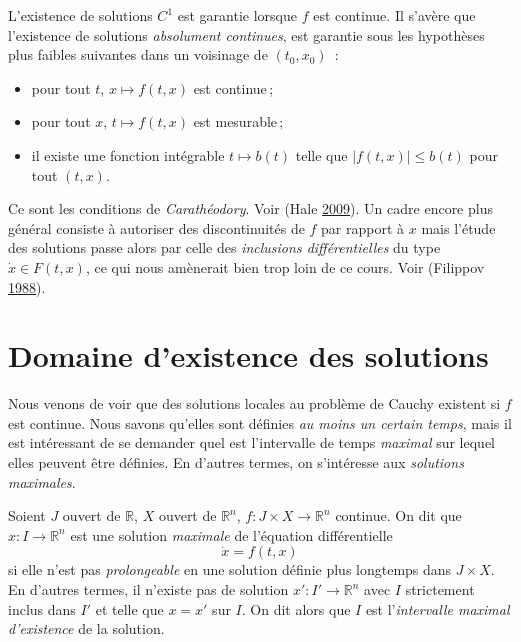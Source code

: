 \hypertarget{classe-plus-guxe9nuxe9rale-de-solutions-pour-la-culture}{}
\begin{remarque}\label{classe-plus-guxe9nuxe9rale-de-solutions-pour-la-culture}
L'existence de solutions \(C^1\) est garantie lorsque \(f\) est
continue. Il s'avère que l'existence de solutions \emph{absolument
continues}, est garantie sous les hypothèses plus faibles suivantes dans
un voisinage de \((t_0,x_0)\)~:

\begin{itemize}
\item
  pour tout \(t\), \(x\mapsto f(t,x)\) est continue\,;
\item
  pour tout \(x\), \(t\mapsto f(t,x)\) est mesurable\,;
\item
  il existe une fonction intégrable \(t\mapsto b(t)\) telle que
  \(|f(t,x)|\leq b(t)\) pour tout \((t,x)\).
\end{itemize}

Ce sont les conditions de \emph{Carathéodory}. Voir (Hale
\protect\hyperlink{ref-Hale}{2009}). Un cadre encore plus général
consiste à autoriser des discontinuités de \(f\) par rapport à \(x\)
mais l'étude des solutions passe alors par celle des \emph{inclusions
différentielles} du type \(\dot{x} \in F(t,x)\), ce qui nous amènerait
bien trop loin de ce cours. Voir (Filippov
\protect\hyperlink{ref-Fil}{1988}).
\end{remarque}

\hypertarget{domaine-dexistence-des-solutions}{%
\section{Domaine d'existence des
solutions}\label{domaine-dexistence-des-solutions}}

Nous venons de voir que des solutions locales au problème de Cauchy
existent si \(f\) est continue. Nous savons qu'elles sont définies
\emph{au moins un certain temps}, mais il est intéressant de se demander
quel est l'intervalle de temps \emph{maximal} sur lequel elles peuvent
être définies. En d'autres termes, on s'intéresse aux \emph{solutions
maximales}.

\hypertarget{def_sol_max}{}
\begin{definition}\label{def_sol_max}
Soient \(J\) ouvert de \(\mathbb{R}\), \(X\) ouvert de
\(\mathbb{R}^{n}\), \(f: J\times X \to \mathbb{R}^n\) continue. On dit
que \(x : I \to\mathbb{R}^n\) est une solution \emph{maximale} de
l'équation différentielle \[
\dot{x}=f(t,x)
\] si elle n'est pas \emph{prolongeable} en une solution définie plus
longtemps dans \(J\times X\). En d'autres termes, il n'existe pas de
solution \(x' : I'\to\mathbb{R}^n\) avec \(I\) strictement inclus dans
\(I'\) et telle que \(x=x'\) sur \(I\). On dit alors que \(I\) est
l'\emph{intervalle maximal d'existence} de la solution.
\end{definition}

